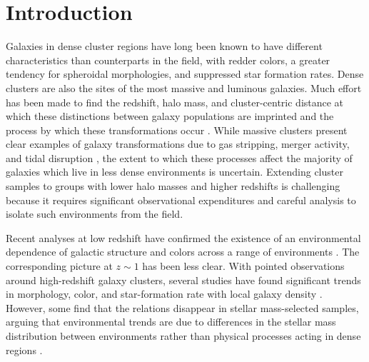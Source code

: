 \section{Introduction}
\setcounter{footnote}{0}

Galaxies in dense cluster regions have long been known to have
different characteristics than counterparts in the field, with redder colors,
a greater tendency for spheroidal morphologies, and suppressed star
formation rates. Dense clusters are also the sites of the most massive
and luminous galaxies. Much effort has been made to find the redshift, halo
mass, and cluster-centric distance at which these distinctions between
galaxy populations are imprinted and the process by which these
transformations occur \citep[e.g.,][]{Oemler1974, Dressler1980, Butcher1984, Dressler1997,
Poggianti1999, Lewis2002, Goto2003, Balogh2004, DePropris2004,
Kauffmann2004, Lin2004a, Blanton2005, Cucciati2006, Cooper2006, Weinmann2006, Capak2007a,
Gerke2007, Blanton2009, Hansen2009, Mei2009, Feruglio2010}.
While massive clusters present clear
examples of galaxy transformations due to gas stripping, merger
activity, and tidal disruption \citep[e.g.,][]{Kenney1995,
  Gavazzi2001, Cortese2007}, the extent to which these
processes  
affect the majority of galaxies which live in less dense environments
is uncertain. Extending cluster samples to groups with lower halo
masses and higher redshifts is challenging because it requires
significant observational expenditures and careful analysis to isolate
such environments from the field. 

Recent analyses at low redshift have confirmed the existence of an
environmental dependence of galactic structure and colors across a
range of environments \citep[e.g.,][]{Kauffmann2004, Baldry2006,
  Bamford2009}. The corresponding picture at $z\sim1$ has been less clear. With
pointed observations around high-redshift galaxy clusters, several
studies have found significant trends in morphology, color, and
star-formation rate with local galaxy density
\citep[e.g.,][]{Postman2005, Smith2005a, Tanaka2005, Poggianti2008}.
However, some find that the relations disappear in stellar mass-selected
samples, arguing that environmental trends are due to differences in
the stellar mass distribution between environments rather than
physical processes acting in dense regions
\citep[e.g.,][]{Poggianti2008}. 

